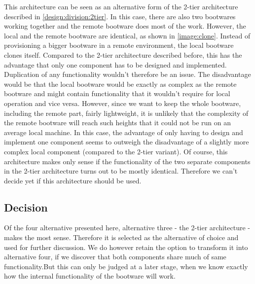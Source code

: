 This architecture can be seen as an alternative form of the 2-tier architecture described in \autoref{design:division:2tier}.
In this case, there are also two bootwares working together and the remote bootware does most of the work.
However, the local and the remote bootware are identical, as shown in \autoref{image:clone}.
Instead of provisioning a bigger bootware in a remote environment, the local bootware clones itself.
Compared to the 2-tier architecture described before, this has the advantage that only one component has to be designed and implemented.
Duplication of any functionality wouldn't therefore be an issue.
The disadvantage would be that the local bootware would be exactly as complex as the remote bootware and might contain functionality that it wouldn't require for local operation and vice versa.
However, since we want to keep the whole bootware, including the remote part, fairly lightweight, it is unlikely that the complexity of the remote bootware will reach such heights that it could not be run on an average local machine.
In this case, the advantage of only having to design and implement one component seems to outweigh the disadvantage of a slightly more complex local component (compared to the 2-tier variant).
Of course, this architecture makes only sense if the functionality of the two separate components in the 2-tier architecture turns out to be mostly identical.
Therefore we can't decide yet if this architecture should be used.

\subsection{Decision}

Of the four alternative presented here, alternative three - the 2-tier architecture - makes the most sense.
Therefore it is selected as the alternative of choice and used for further discussion.
We do however retain the option to transform it into alternative four, if we discover that both components share much of same functionality.But this can only be judged at a later stage, when we know exactly how the internal functionality of the bootware will work.
